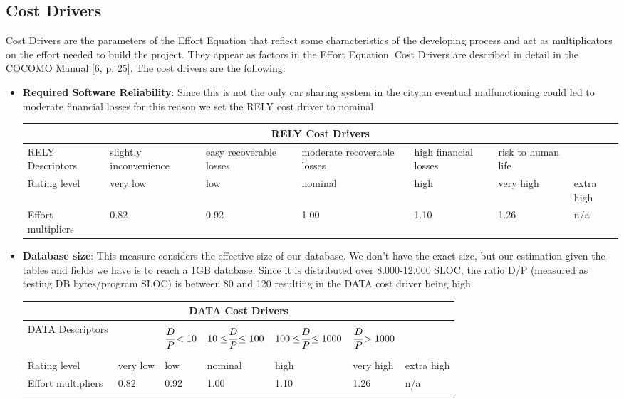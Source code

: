 \subsection{Cost Drivers}
Cost Drivers are the parameters of the Effort Equation that reflect some characteristics of the developing process and act as multiplicators on the effort needed to build the project. They appear as factors in the Effort Equation. Cost Drivers are described in detail in the COCOMO Manual [6, p. 25].
The cost drivers are the following:
\begin{itemize}
\item \textbf{Required Software Reliability}: Since this is not the only car sharing system in the city,an eventual malfunctioning could led to moderate financial losses,for this reason we set the RELY cost driver to nominal. 

\begin{longtable}{| m{}| m{} | m{} | m{} | m{} | m{} | m{}| }
\hline
\multicolumn{7}{c}{RELY Cost Drivers}\\
\hline
\hline
RELY Descriptors & slightly inconvenience & easy recoverable losses & moderate recoverable losses & high financial losses & risk to human life & \\
\hline
Rating level & very low & low & nominal & high & very high & extra high \\
\hline
Effort multipliers & 0.82 & 0.92 & 1.00 & 1.10 & 1.26 & n/a \\
\hline
\end{longtable}

\item \textbf{Database size}: This measure considers the effective size of our database. We don't have the exact size, but our estimation given the tables and fields we have is to reach a 1GB database. Since it is
distributed over 8.000-12.000 SLOC, the ratio D/P (measured as testing DB bytes/program SLOC) is between 80 and 120 resulting in the DATA cost driver being high.

\begin{longtable}{| m{}| m{} | m{} | m{} | m{} | m{} | m{}| }
\hline
\multicolumn{7}{c}{DATA Cost Drivers}\\
\hline
\hline
DATA Descriptors &  & \begin{equation*}
 {D \over P} {<10} 
\end{equation*} & 
\begin{equation*}
{10\le} {D \over P} {\le 100}
\end{equation*}& 
\begin{equation*}
{100\le} {D \over P} {\le 1000}
\end{equation*} & 
\begin{equation*}
 {D \over P} {>1000} 
\end{equation*}
& \\
\hline
Rating level & very low & low & nominal & high & very high & extra high \\
\hline
Effort multipliers & 0.82 & 0.92 & 1.00 & 1.10 & 1.26 & n/a \\
\hline
\end{longtable}


\end{itemize}
